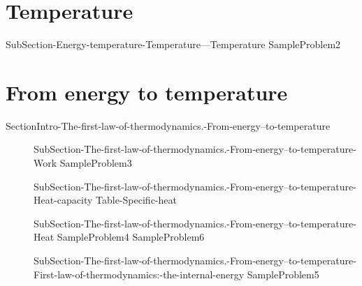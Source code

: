 \documentclass[main.tex]{subfiles}
\newcommand\chapterlabel{Ch-thermochemistry}\setcounter{figurenewcounter}{0}\setcounter{tablenewcounter}{0}\setcounter{formulanewcounter}{0}
\begin{document}
\section{Temperature}
 {SubSection-Energy-temperature-Temperature---Temperature}
{SampleProblem2}
 

\section{From energy  to temperature}
{SectionIntro-The-first-law-of-thermodynamics.-From-energy--to-temperature}
\sloppy\begin{description}
\item[] {SubSection-The-first-law-of-thermodynamics.-From-energy--to-temperature-Work}%
{SampleProblem3}%
\item[] {SubSection-The-first-law-of-thermodynamics.-From-energy--to-temperature-Heat-capacity}
{Table-Specific-heat}
\item[] {SubSection-The-first-law-of-thermodynamics.-From-energy--to-temperature-Heat}
{SampleProblem4}
{SampleProblem6}
\item[] {SubSection-The-first-law-of-thermodynamics.-From-energy--to-temperature-First-law-of-thermodynamics:-the-internal-energy}%
{SampleProblem5}%
\end{description}
\end{document}
